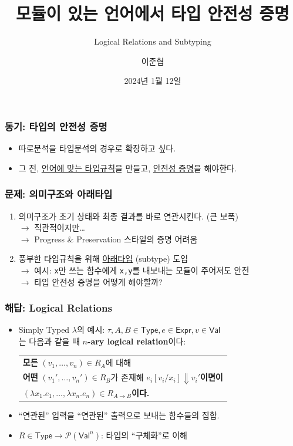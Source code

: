 \documentclass{beamer}
\title{모듈이 있는 언어에서 타입 안전성 증명}
\subtitle{Logical Relations and Subtyping}
\author{이준협}
\date{2024년 1월 12일}
\institute{ROPAS{@}SNU}
\theoremstyle{definition}
\begin{document}
\maketitle
\begin{frame}[c,fragile]
  \frametitle{동기: 타입의 안전성 증명}
  \begin{itemize}
    \item 따로분석을 타입분석의 경우로 확장하고 싶다.
    \item 그 전, \underline{언어에 맞는 타입규칙}을 만들고, \underline{안전성 증명}을 해야한다.
  \end{itemize}
\end{frame}
\begin{frame}[c, fragile]
  \frametitle{문제: 의미구조와 아래타입}
  \begin{enumerate}
    \item 의미구조가 초기 상태와 최종 결과를 바로 연관시킨다. (큰 보폭)\\
          $\rightarrow$ 직관적이지만\dots\\
          $\rightarrow$ Progress \& Preservation 스타일의 증명 어려움
    \item 풍부한 타입규칙을 위해 \underline{아래타입} (subtype) 도입\\
          $\rightarrow$ 예시: \texttt{x}만 쓰는 함수에게 \texttt{x,y}를 내보내는 모듈이 주어져도 안전\\
          $\rightarrow$ 타입 안전성 증명을 어떻게 해야할까?
  \end{enumerate}
\end{frame}
\begin{frame}[c, fragile]
  \frametitle{해답: Logical Relations}
  \begin{itemize}
    \item Simply Typed $\lambda$의 예시: $\tau,A,B\in\textsf{Type},e\in\textsf{Expr},v\in\textsf{Val}$\\
          는 다음과 같을 때 $n$\textbf{-ary logical relation}이다:\\
          \begin{center}
            \begin{tabular}{|l|}
              \hline
              \textbf{모든} $(v_1,\dots,v_n)\in R_A$에 대해                                              \\
              \textbf{어떤} $(v_1',\dots,v_n')\in R_B$가 존재해 $e_i[v_i/x_i]\Downarrow v_i'$\textbf{이면이} \\
              $(\lambda x_1.e_1,\dots,\lambda x_n.e_n)\in R_{A\rightarrow B}$\textbf{이다.}           \\
              \hline
            \end{tabular}
          \end{center}
    \item ``연관된'' 입력을 ``연관된'' 출력으로 보내는 함수들의 집합.
    \item $R\in\textsf{Type}\rightarrow \mathcal{P}(\textsf{Val}^n)$: 타입의 ``구체화''로 이해
  \end{itemize}
\end{frame}
\end{document}
